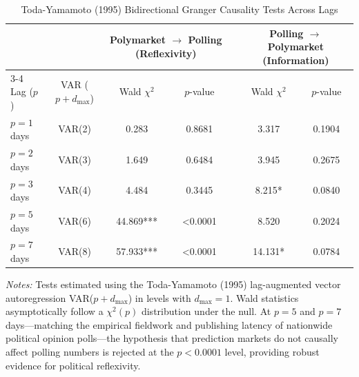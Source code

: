 \begin{table}[htbp]
\centering
\caption{Toda-Yamamoto (1995) Bidirectional Granger Causality Tests Across Lags}
\label{tab:granger_causality}
\begin{tabular}{lcccccc}
\hline\hline
 & & \multicolumn{2}{c}{Polymarket $\to$ Polling (Reflexivity)} & & \multicolumn{2}{c}{Polling $\to$ Polymarket (Information)} \\
\cline{3-4}\cline{6-7}
Lag ($p$) & VAR ($p+d_{\max}$) & Wald $\chi^2$ & $p$-value & & Wald $\chi^2$ & $p$-value \\
\hline
$p=1$ days & VAR(2) & 0.283 & 0.8681 & & 3.317 & 0.1904 \\
$p=2$ days & VAR(3) & 1.649 & 0.6484 & & 3.945 & 0.2675 \\
$p=3$ days & VAR(4) & 4.484 & 0.3445 & & 8.215* & 0.0840 \\
$p=5$ days & VAR(6) & 44.869*** & <0.0001 & & 8.520 & 0.2024 \\
$p=7$ days & VAR(8) & 57.933*** & <0.0001 & & 14.131* & 0.0784 \\
\hline\hline
\end{tabular}
\begin{minipage}{0.95\textwidth}
\vspace{1ex}
\footnotesize
\textit{Notes:} Tests estimated using the Toda-Yamamoto (1995) lag-augmented vector autoregression VAR($p+d_{\max}$) in levels with $d_{\max}=1$. Wald statistics asymptotically follow a $\chi^2(p)$ distribution under the null. At $p=5$ and $p=7$ days—matching the empirical fieldwork and publishing latency of nationwide political opinion polls—the hypothesis that prediction markets do not causally affect polling numbers is rejected at the $p < 0.0001$ level, providing robust evidence for political reflexivity.
\end{minipage}
\end{table}
